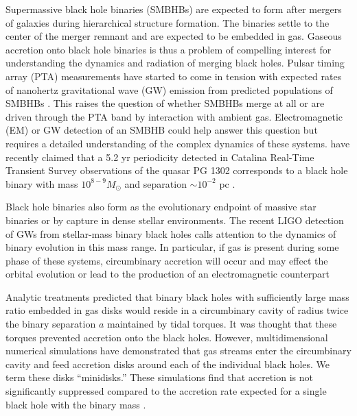 \documentclass{emulateapj}
\begin{document}
Supermassive black hole binaries (SMBHBs) are expected to form after mergers of galaxies during hierarchical structure formation.  The binaries settle to the center of the merger remnant and are expected to be embedded in gas. Gaseous accretion onto black hole binaries is thus a problem of compelling interest for understanding the dynamics and radiation of merging black holes. Pulsar timing array (PTA) measurements have started to come in tension with expected rates of nanohertz gravitational wave (GW) emission from predicted populations of SMBHBs \citep{Shannon15}. This raises the question of whether SMBHBs merge at all or are driven through the PTA band by interaction with ambient gas. Electromagnetic (EM) or GW detection of an SMBHB could help answer this question but requires a detailed understanding of the complex dynamics of these systems. \cite{Graham15A} have recently claimed that a 5.2 yr periodicity detected in Catalina Real-Time Transient Survey observations of the quasar PG 1302 corresponds to a black hole binary with mass $10^{8-9}M_{\odot}$ and separation $\sim 10^{-2}$ pc \citep[see also][]{Graham15B}. 

Black hole binaries also form as the evolutionary endpoint of massive star binaries or by capture in dense stellar environments. The recent LIGO detection of GWs from stellar-mass binary black holes calls attention to the dynamics of binary evolution in this mass range. In particular, if gas is present during some phase of these systems, circumbinary accretion will occur and may effect the orbital evolution or lead to the production of an electromagnetic counterpart \citep{Bartos16, Perna16}

Analytic treatments \citep{Artymowicz94,Milos05,Shapiro10} predicted that binary black holes with sufficiently large mass ratio embedded in gas disks would reside in a circumbinary cavity of radius twice the binary separation $a$ maintained by tidal torques. It was thought that these torques prevented accretion onto the black holes. However, multidimensional numerical simulations \citep{MacFadyen08, Noble12, Farris12, DOrazio12,Gold14, Farris14, Farris15A, Farris15B,Shi15, Bankert15,Schnittman15,delValle15,Young15,DOrazio16, Munoz16,Miranda16} have demonstrated that gas streams enter the circumbinary cavity and feed accretion disks around each of the individual black holes. We term these disks ``minidisks.'' These simulations find that accretion is not significantly suppressed compared to the accretion rate expected for a single black hole with the binary mass \citep{Farris14,Shi15}.
\end{document}
